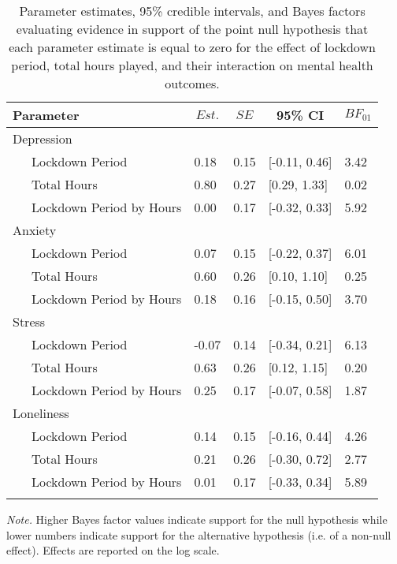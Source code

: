 \documentclass[
  english,
  man,floatsintext]{apa6}
\begin{document}
\begin{table}[!htbp]

\begin{center}
\begin{threeparttable}

\caption{\label{tab:study-two-mh-bayes-pre-post}Parameter estimates, 95\% credible intervals, and Bayes factors evaluating evidence in support of the point null hypothesis that each parameter estimate is equal to zero for the effect of lockdown period, total hours played, and their interaction on mental health outcomes.}

\begin{tabular}{lllll}
\toprule
Parameter & \multicolumn{1}{c}{$Est.$} & \multicolumn{1}{c}{$SE$} & \multicolumn{1}{c}{95\% CI} & \multicolumn{1}{c}{$BF_{01}$}\\
\midrule
Depression &  &  &  & \\
\ \ \ Lockdown Period & 0.18 & 0.15 & {}[-0.11, 0.46] & 3.42\\
\ \ \ Total Hours & 0.80 & 0.27 & {}[0.29, 1.33] & 0.02\\
\ \ \ Lockdown Period by Hours & 0.00 & 0.17 & {}[-0.32, 0.33] & 5.92\\
Anxiety &  &  &  & \\
\ \ \ Lockdown Period & 0.07 & 0.15 & {}[-0.22, 0.37] & 6.01\\
\ \ \ Total Hours & 0.60 & 0.26 & {}[0.10, 1.10] & 0.25\\
\ \ \ Lockdown Period by Hours & 0.18 & 0.16 & {}[-0.15, 0.50] & 3.70\\
Stress &  &  &  & \\
\ \ \ Lockdown Period & -0.07 & 0.14 & {}[-0.34, 0.21] & 6.13\\
\ \ \ Total Hours & 0.63 & 0.26 & {}[0.12, 1.15] & 0.20\\
\ \ \ Lockdown Period by Hours & 0.25 & 0.17 & {}[-0.07, 0.58] & 1.87\\
Loneliness &  &  &  & \\
\ \ \ Lockdown Period & 0.14 & 0.15 & {}[-0.16, 0.44] & 4.26\\
\ \ \ Total Hours & 0.21 & 0.26 & {}[-0.30, 0.72] & 2.77\\
\ \ \ Lockdown Period by Hours & 0.01 & 0.17 & {}[-0.33, 0.34] & 5.89\\
\bottomrule
\addlinespace
\end{tabular}

\begin{tablenotes}[para]
\normalsize{\textit{Note.} Higher Bayes factor values indicate support for the null hypothesis while lower numbers indicate support for the alternative hypothesis (i.e. of a non-null effect). Effects are reported on the log scale.}
\end{tablenotes}

\end{threeparttable}
\end{center}

\end{table}
\end{document}
